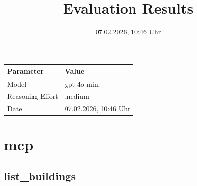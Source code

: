 \documentclass[a4paper,11pt]{article}
\title{Evaluation Results}
\date{07.02.2026, 10:46 Uhr}
\begin{document}
\maketitle

\begin{table}[H]
\centering
\begin{tabular}{l l}
\toprule
\textbf{Parameter} & \textbf{Value} \\
\midrule
Model & gpt-4o-mini \\
Reasoning Effort & medium \\
Date & 07.02.2026, 10:46 Uhr \\
\bottomrule
\end{tabular}
\end{table}

\tableofcontents
\clearpage

\section{mcp}

\subsection{list\_buildings}
\end{document}
